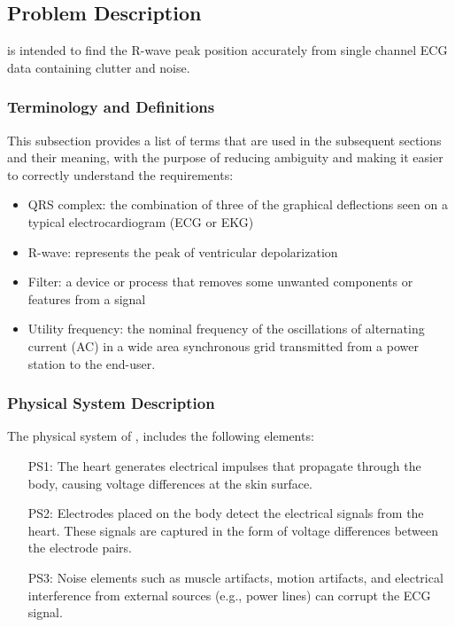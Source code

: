 \documentclass[12pt]{article}
\begin{document}
\subsection{Problem Description} \label{Sec_pd}

\progname{} is intended to find the R-wave peak position accurately from single
channel ECG data containing clutter and noise.

\subsubsection{Terminology and  Definitions}

This subsection provides a list of terms that are used in the subsequent
sections and their meaning, with the purpose of reducing ambiguity and making it
easier to correctly understand the requirements:

\begin{itemize}

\item QRS complex: the combination of three of the graphical deflections seen on
a typical electrocardiogram (ECG or EKG)\cite{wiki:QRS_complex}
\item R-wave: represents the peak of ventricular depolarization
\item Filter: a device or process that removes some unwanted components or
features from a signal\cite{wiki:Filter_(signal_processing)}
\item Utility frequency: the nominal frequency of the oscillations of
alternating current (AC) in a wide area synchronous grid transmitted from a
power station to the end-user.\cite{wiki:Utility_frequency}

\end{itemize}

\subsubsection{Physical System Description} \label{sec_phySystDescrip}

The physical system of \progname{}, includes the following elements:

\begin{itemize}

\item[PS1:] The heart generates electrical impulses that propagate through the
body, causing voltage differences at the skin surface.

\item[PS2:] Electrodes placed on the body detect the electrical signals from the
heart.  These signals are captured in the form of voltage differences between
the electrode pairs.

\item[PS3:] Noise elements such as muscle artifacts, motion artifacts, and
electrical interference from external sources (e.g., power lines) can corrupt
the ECG signal.

\end{itemize}
\end{document}
